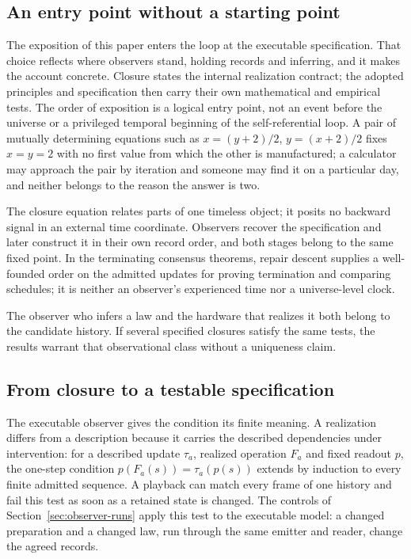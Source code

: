 \documentclass[11pt]{article}
\theoremstyle{definition}
\theoremstyle{remark}
\begin{document}
\subsection{An entry point without a starting point}

The exposition of this paper enters the loop at the executable
specification. That choice reflects where observers stand, holding records
and inferring, and it makes the account concrete. Closure states the internal
realization contract; the adopted principles and specification then carry
their own mathematical and empirical tests. The order of exposition is a logical entry point, not an event before
the universe or a privileged temporal beginning of the self-referential
loop. A pair of mutually determining
equations such as $x=(y+2)/2$, $y=(x+2)/2$ fixes $x=y=2$ with no first value
from which the other is manufactured; a calculator may approach the pair by
iteration and someone may find it on a particular day, and neither belongs
to the reason the answer is two.

The closure equation relates parts of one timeless object; it posits no
backward signal in an external time coordinate. Observers recover the specification and later construct
it in their own record order, and both stages belong to the same fixed
point. In the terminating consensus theorems, repair descent supplies a
well-founded order on the admitted updates for proving termination and
comparing schedules; it is neither an observer's
experienced time nor a universe-level clock.

The observer who infers a law and the hardware that realizes it both
belong to the candidate history. If several specified closures satisfy
the same tests, the results warrant that observational class without a
uniqueness claim.

\subsection{From closure to a testable specification}
\label{sec:closure-to-model}

The executable observer gives the condition its finite meaning. A
realization differs from a description because it carries the described
dependencies under intervention: for a described update $\tau_a$, realized operation $F_a$ and fixed readout $p$, the one-step condition $p(F_a(s))=\tau_a(p(s))$ extends by induction to every finite admitted sequence. A playback can match every frame of one history and fail
this test as soon as a retained state is changed. The controls of
Section~\ref{sec:observer-runs} apply this test to the executable model:
a changed preparation and a changed law, run through the same emitter and
reader, change the agreed records.
\end{document}
